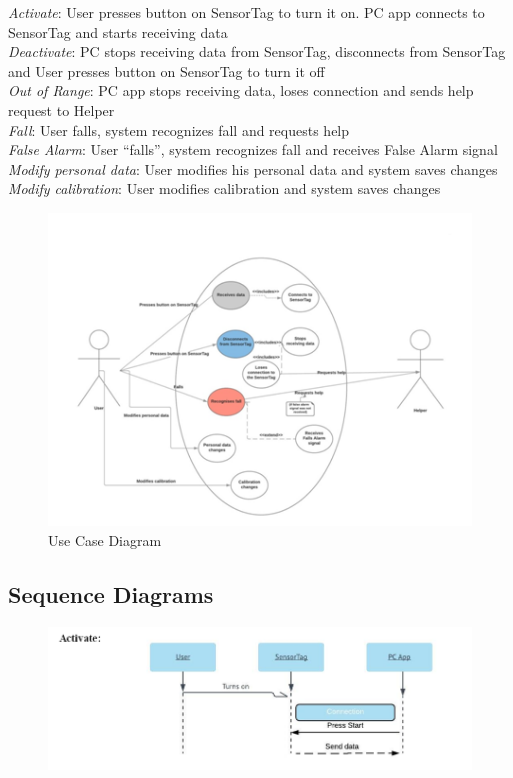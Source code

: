 \documentclass[conference,12pt]{IEEETran}
\begin{document}
\textit{Activate}: User presses button on SensorTag to turn it on. PC app connects to SensorTag and starts receiving data\\
\textit{Deactivate}: PC stops receiving data from SensorTag, disconnects from SensorTag and User presses button on SensorTag to turn it off\\
\textit{Out of Range}: PC app stops receiving data, loses connection and sends help request to Helper\\
\textit{Fall}: User falls, system recognizes fall and requests help\\
\textit{False Alarm}: User “falls”, system recognizes fall and receives False Alarm signal\\
\textit{Modify personal data}: User modifies his personal data and system saves changes\\
\textit{Modify calibration}:  User modifies calibration and system saves changes\\
\FloatBarrier
\begin{figure}[!h]
	\centering
	\includegraphics[scale=0.8]{images/Use_Case_Diag.png}
	\caption{Use Case Diagram}
	\label{img:Use_Diag}
\end{figure}
\FloatBarrier

\subsection{Sequence Diagrams}

\FloatBarrier
\begin{figure}[!h]
	\centering
	\includegraphics[scale=0.4]{images/Seq_Activate.png}
	\label{img:activate}
\end{figure}
\FloatBarrier
\end{document}
